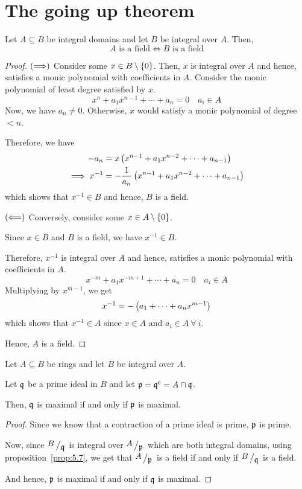 \section{The going up theorem}
\begin{proposition}{}{}
\label{prop:5.7}
	Let \(A \subseteq B\) be integral domains and let \(B\) be integral
	over \(A\).
	Then,
	\[
		A \text{ is a field} \iff B \text{ is a field}
	\]
\end{proposition}
\begin{proof}
	\(\left( \Longrightarrow \right)\) Consider some \(x \in B \setminus \left\{ 0 \right\}\).
	Then, \(x\) is integral over \(A\) and hence, satisfies a monic
	polynomial with coefficients in \(A\).
	Consider the monic polynomial of least degree satisfied by \(x\).
	\[
		x^n + a_1 x^{n-1} + \cdots + a_n = 0 \quad a_i \in A
	\]
	Now, we have \(a_n \neq 0\).
	Otherwise, \(x\) would satisfy a monic polynomial of degree \(< n\).

	Therefore, we have
	\begin{align*}
		-a_n &= x \left( x^{n-1} + a_1 x^{n-2} + \cdots + a_{n-1} \right) \\
		\implies x^{-1} &= - \frac{1}{a_n} \left( x^{n-1} + a_1 x^{n-2}
			+ \cdots + a_{n-1} \right)
	\end{align*}
	which shows that \(x^{-1} \in B\) and hence, \(B\) is a field.
	
	\vspace{1em}

	\(\left( \Longleftarrow \right)\) Conversely, consider some
	\(x \in A \setminus \left\{ 0 \right\}\).

	Since \(x \in B\) and \(B\) is a field, we have \(x^{-1} \in B\).

	Therefore, \(x^{-1}\) is integral over \(A\) and hence, satisfies
	a monic polynomial with coefficients in \(A\).
	\[
		x^{-m} + a_1 x^{-m+1} + \cdots + a_n = 0 \quad a_i \in A
	\]
	Multiplying by \(x^{m-1}\), we get
	\[
		x^{-1} = - \left( a_1 + \cdots + a_n x^{m-1} \right)
	\]
	which shows that \(x^{-1} \in A\) since \(x \in A\) and
	\(a_i \in A \ \forall\ i\).

	Hence, \(A\) is a field.
\end{proof}


\begin{corollary}{}{}
\label{cor:5.8}
	Let \(A \subseteq B\) be rings and let \(B\) be integral over \(A\).

	Let \(\mathfrak{q}\) be a prime ideal in \(B\) and let
	\(\mathfrak{p} = \mathfrak{q}^c = A \cap \mathfrak{q}\).

	Then, \(\mathfrak{q}\) is maximal if and only if \(\mathfrak{p}\) is maximal.
\end{corollary}
\begin{proof}
	Since we know that a contraction of a prime ideal is prime,
	\(\mathfrak{p}\) is prime.

	Now, since \(\bigslant{B}{\mfq}\) is integral over \(\bigslant{A}{\mfp}\)
	which are both integral domains, using proposition~\ref{prop:5.7},
	we get that \(\bigslant{A}{\mfp}\) is a field if and only if
	\(\bigslant{B}{\mfq}\) is a field.

	And hence, \(\mathfrak{p}\) is maximal if and only if \(\mathfrak{q}\) is maximal.
\end{proof}

